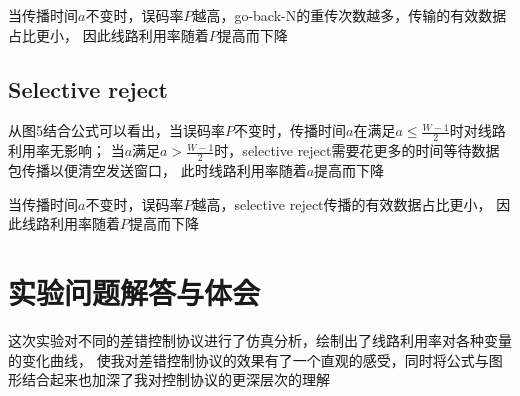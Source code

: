 \documentclass[a4paper]{ctexart}
\begin{document}
    当传播时间$a$不变时，误码率$P$越高，go-back-N的重传次数越多，传输的有效数据占比更小，
    因此线路利用率随着$P$提高而下降
    \subsection*{Selective reject}
    从图5结合公式可以看出，当误码率$P$不变时，传播时间$a$在满足$a \leq \frac{W-1}{2}$时对线路利用率无影响；
    当$a$满足$a > \frac{W-1}{2}$时，selective reject需要花更多的时间等待数据包传播以便清空发送窗口，
    此时线路利用率随着$a$提高而下降

    当传播时间$a$不变时，误码率$P$越高，selective reject传播的有效数据占比更小，
    因此线路利用率随着$P$提高而下降


    \newpage
    \section{实验问题解答与体会}
    这次实验对不同的差错控制协议进行了仿真分析，绘制出了线路利用率对各种变量的变化曲线，
    使我对差错控制协议的效果有了一个直观的感受，同时将公式与图形结合起来也加深了我对控制协议的更深层次的理解
\end{document}
